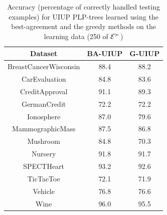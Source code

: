 \begin{table}
  \centering
  \small
  \caption{Accuracy (percentage of correctly handled testing examples)
					 for UIUP PLP-trees learned using the best-agreement and
					 the greedy methods on the learning 
					 data (250 of $\mathcal{E}^\succ$)}
  \begin{tabular}{ |c||c|c| }
    \hline
    Dataset          & BA-UIUP & G-UIUP \\
    \hline \hline                               
    BreastCancerWisconsin              & 88.4   & 88.2     \\ \hline
    CarEvaluation               & 84.8   & 83.6     \\ \hline
    CreditApproval               & 91.1   & 89.3     \\ \hline
    GermanCredit               & 72.2   & 72.2     \\ \hline
    Ionosphere               & 87.0   & 79.6     \\ \hline
    MammographicMass               & 87.5   & 86.8     \\ \hline
    Mushroom               & 84.8   & 70.3     \\ \hline
    Nursery               & 91.8   & 91.7     \\ \hline
    SPECTHeart               & 93.2   & 92.6     \\ \hline
    TicTacToe              & 72.1   & 71.9     \\ \hline
    Vehicle               & 76.8   & 76.6     \\ \hline
    Wine               & 96.0   & 95.5     \\ \hline
  \end{tabular}
  \label{tbl:trees1}
\end{table}

%
%

